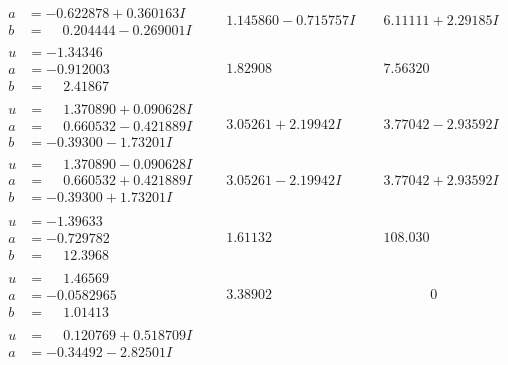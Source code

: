 \documentclass[1p]{elsarticle_modified}
\theoremstyle{definition}
\begin{document}
$$\begin{array}{c|c|c}
\begin{aligned}
a &= -0.622878 + 0.360163 I \\
b &= \phantom{-}0.204444 - 0.269001 I\end{aligned}
 & \phantom{-}1.145860 - 0.715757 I & \phantom{-}6.11111 + 2.29185 I \\ \hline\begin{aligned}
u &= -1.34346\phantom{ +0.000000I} \\
a &= -0.912003\phantom{ +0.000000I} \\
b &= \phantom{-}2.41867\phantom{ +0.000000I}\end{aligned}
 & \phantom{-}1.82908\phantom{ +0.000000I} & \phantom{-}7.56320\phantom{ +0.000000I} \\ \hline\begin{aligned}
u &= \phantom{-}1.370890 + 0.090628 I \\
a &= \phantom{-}0.660532 - 0.421889 I \\
b &= -0.39300 - 1.73201 I\end{aligned}
 & \phantom{-}3.05261 + 2.19942 I & \phantom{-}3.77042 - 2.93592 I \\ \hline\begin{aligned}
u &= \phantom{-}1.370890 - 0.090628 I \\
a &= \phantom{-}0.660532 + 0.421889 I \\
b &= -0.39300 + 1.73201 I\end{aligned}
 & \phantom{-}3.05261 - 2.19942 I & \phantom{-}3.77042 + 2.93592 I \\ \hline\begin{aligned}
u &= -1.39633\phantom{ +0.000000I} \\
a &= -0.729782\phantom{ +0.000000I} \\
b &= \phantom{-}12.3968\phantom{ +0.000000I}\end{aligned}
 & \phantom{-}1.61132\phantom{ +0.000000I} & \phantom{-}108.030\phantom{ +0.000000I} \\ \hline\begin{aligned}
u &= \phantom{-}1.46569\phantom{ +0.000000I} \\
a &= -0.0582965\phantom{ +0.000000I} \\
b &= \phantom{-}1.01413\phantom{ +0.000000I}\end{aligned}
 & \phantom{-}3.38902\phantom{ +0.000000I} & \phantom{-0.000000 } 0 \\ \hline\begin{aligned}
u &= \phantom{-}0.120769 + 0.518709 I \\
a &= -0.34492 - 2.82501 I \\

\end{aligned}
\end{array}$$
\end{document}
